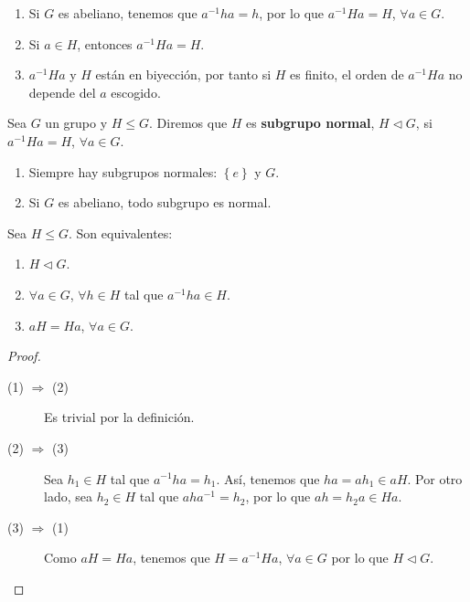 \begin{observation}
\begin{enumerate}
\item Si $\displaystyle G $ es abeliano, tenemos que $\displaystyle a^{-1}ha = h $, por lo que $\displaystyle a^{-1}Ha = H $, $\displaystyle \forall a \in G $.
\item Si $\displaystyle a \in H $, entonces $\displaystyle a^{-1}Ha = H $.
\item $\displaystyle a^{-1}Ha $ y $\displaystyle H $ están en biyección, por tanto si $\displaystyle H $ es finito, el orden de $\displaystyle a^{-1}Ha $ no depende del $\displaystyle a $ escogido.
\end{enumerate}
\end{observation}
\begin{definition}
Sea $\displaystyle G $ un grupo y $\displaystyle H \leq G $. Diremos que $\displaystyle H $ es \textbf{subgrupo normal}, $\displaystyle H \lhd G $, si $\displaystyle a^{-1}Ha = H $, $\displaystyle \forall a \in G $.
\end{definition}
\begin{observation}
\begin{enumerate}
	\item Siempre hay subgrupos normales: $\displaystyle \left\{ e\right\}  $ y $\displaystyle G $.
	\item Si $\displaystyle G $ es abeliano, todo subgrupo es normal.
\end{enumerate}
\end{observation}
\begin{lema}
Sea $\displaystyle H \leq G $. Son equivalentes:
\begin{enumerate}
\item $\displaystyle H \lhd G $.
\item $\displaystyle \forall a \in G $, $\displaystyle \forall h \in H $ tal que $\displaystyle a^{-1}ha \in H $. 
\item $\displaystyle aH = Ha $, $\displaystyle \forall a \in G $.
\end{enumerate}
\end{lema}
\begin{proof}
\begin{description}
\item[(1) $\displaystyle \Rightarrow $ (2)] Es trivial por la definición.
\item[(2) $\displaystyle \Rightarrow $ (3)] Sea $\displaystyle h_{1} \in H $ tal que $\displaystyle a^{-1}ha = h_{1} $. Así, tenemos que $\displaystyle ha = ah_{1}\in aH $. Por otro lado, sea $\displaystyle h_{2} \in H $ tal que $\displaystyle aha^{-1} = h_{2} $, por lo que $\displaystyle ah = h_{2}a \in Ha $.
\item[(3) $\displaystyle \Rightarrow $ (1)] Como $\displaystyle aH = Ha $, tenemos que $\displaystyle H = a^{-1}Ha $, $\displaystyle \forall a \in G $ por lo que $\displaystyle H \lhd G $.
\end{description}
\end{proof}
